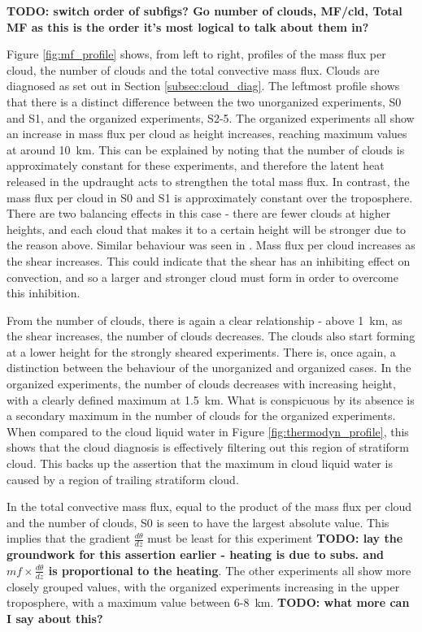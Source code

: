 \documentclass[11pt,a4paper]{article}
\newcommand\todo[1]{\textbf{TODO: #1}}
\begin{document}
\todo{switch order of subfigs? Go number of clouds, MF/cld, Total MF as this is the order it's most logical to talk about them in?}

Figure \ref{fig:mf_profile} shows, from left to right, profiles of the mass flux per cloud, the number of clouds and the total convective mass flux. Clouds are diagnosed as set out in Section \ref{subsec:cloud_diag}. The leftmost profile shows that there is a distinct difference between the two unorganized experiments, S0 and S1, and the organized experiments, S2-5. The organized experiments all show an increase in mass flux per cloud as height increases, reaching maximum values at around \SI{10}{km}. This can be explained by noting that the number of clouds is approximately constant for these experiments, and therefore the latent heat released in the updraught acts to strengthen the total mass flux. In contrast, the mass flux per cloud in S0 and S1 is approximately constant over the troposphere. There are two balancing effects in this case - there are fewer clouds at higher heights, and each cloud that makes it to a certain height will be stronger due to the reason above. Similar behaviour was seen in \cite{PC2008}. Mass flux per cloud increases as the shear increases. This could indicate that the shear has an inhibiting effect on convection, and so a larger and stronger cloud must form in order to overcome this inhibition.

From the number of clouds, there is again a clear relationship - above \SI{1}{km}, as the shear increases, the number of clouds decreases. The clouds also start forming at a lower height for the strongly sheared experiments. There is, once again, a distinction between the behaviour of the unorganized and organized cases. In the organized experiments, the number of clouds decreases with increasing height, with a clearly defined maximum at \SI{1.5}{km}. What is conspicuous by its absence is a secondary maximum in the number of clouds for the organized experiments. When compared to the cloud liquid water in Figure \ref{fig:thermodyn_profile}, this shows that the cloud diagnosis is effectively filtering out this region of stratiform cloud. This backs up the assertion that the maximum in cloud liquid water is caused by a region of trailing stratiform cloud.

In the total convective mass flux, equal to the product of the mass flux per cloud and the number of clouds, S0 is seen to have the largest absolute value. This implies that the gradient $\frac{d \theta}{dz}$ must be least for this experiment \todo{lay the groundwork for this assertion earlier - heating is due to subs. and $mf \times \frac{d \theta}{dz}$ is proportional to the heating}. The other experiments all show more closely grouped values, with the organized experiments increasing in the upper troposphere, with a maximum value between \SI{6}{}-\SI{8}{km}. \todo{what more can I say about this?}
\end{document}
